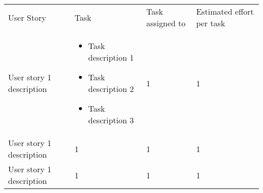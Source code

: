 \begin{table}[h]
\begin{tabular}{llll}
User Story & Task & Task assigned to & Estimated effort per task \\
User story 1 description & 
\begin{itemize}
\item Task description 1
\item Task description 2
\item Task description 3
\end{itemize} & 1 & 1 \\

User story 1 description & 1 & 1 & 1 \\

User story 1 description & 1 & 1 & 1
\end{tabular}
\end{table}